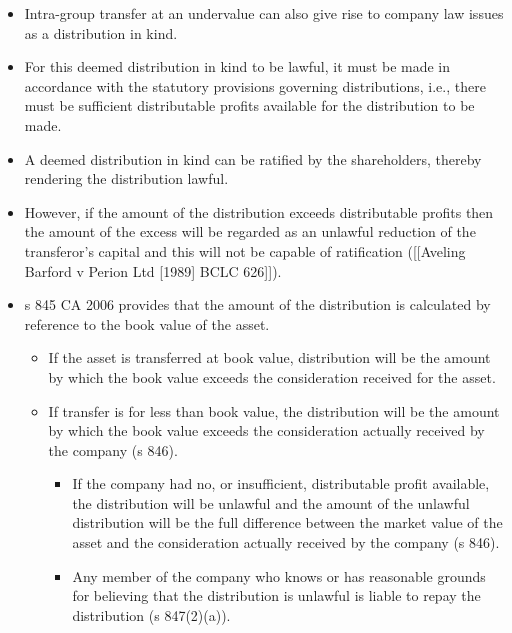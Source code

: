 \documentclass[
]{article}
\providecommand{\tightlist}{%
  \setlength{\itemsep}{0pt}\setlength{\parskip}{0pt}}
\begin{document}
\begin{itemize}
\tightlist
\item
  Intra-group transfer at an undervalue can also give rise to company
  law issues as a distribution in kind.
\item
  For this deemed distribution in kind to be lawful, it must be made in
  accordance with the statutory provisions governing distributions,
  i.e., there must be sufficient distributable profits available for the
  distribution to be made.
\item
  A deemed distribution in kind can be ratified by the shareholders,
  thereby rendering the distribution lawful.
\item
  However, if the amount of the distribution exceeds distributable
  profits then the amount of the excess will be regarded as an unlawful
  reduction of the transferor's capital and this will not be capable of
  ratification ({[}{[}Aveling Barford v Perion Ltd {[}1989{]} BCLC
  626{]}{]}).
\item
  s 845 CA 2006 provides that the amount of the distribution is
  calculated by reference to the book value of the asset.

  \begin{itemize}
  \tightlist
  \item
    If the asset is transferred at book value, distribution will be the
    amount by which the book value exceeds the consideration received
    for the asset.
  \item
    If transfer is for less than book value, the distribution will be
    the amount by which the book value exceeds the consideration
    actually received by the company (s 846).

    \begin{itemize}
    \tightlist
    \item
      If the company had no, or insufficient, distributable profit
      available, the distribution will be unlawful and the amount of the
      unlawful distribution will be the full difference between the
      market value of the asset and the consideration actually received
      by the company (s 846).
    \item
      Any member of the company who knows or has reasonable grounds for
      believing that the distribution is unlawful is liable to repay the
      distribution (s 847(2)(a)).
    \end{itemize}
  \end{itemize}
\end{itemize}
\end{document}
